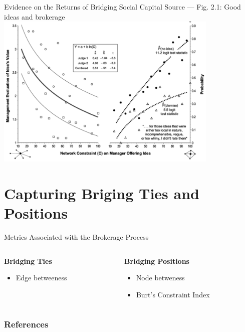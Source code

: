 \documentclass[notes, aspectratio=1610]{beamer}
\begin{document}
\begin{frame}{Evidence on the Returns of Bridging Social Capital}
	{Source \cite{burt2007} --- Fig. 2.1: Good ideas and brokerage}
	\centering
	\includegraphics[width=0.8\textwidth]{images/good_ideas.png}
\end{frame}

\section{Capturing Briging Ties and Positions}

\begin{frame}{Metrics Associated with the Brokerage Process}
	\begin{columns}[t]
		\begin{column}{0.5\textwidth}
			\textbf{Bridging Ties}
			\begin{itemize}
				\item Edge betweeness
			\end{itemize}
		\end{column}
		\begin{column}{0.5\textwidth}
			\textbf{Bridging Positions}
			\begin{itemize}
				\item Node betweness
				\item Burt's Constraint Index
			\end{itemize}
		\end{column}
	\end{columns}
\end{frame}

\begin{frame}
	\frametitle{References}
	\printbibliography
 \end{frame} 

\end{document}
